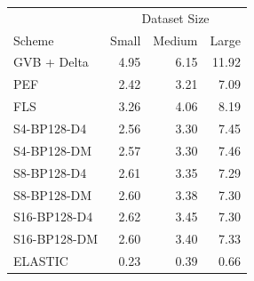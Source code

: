 \begin{tabular}{lrrr}
\toprule
 & \multicolumn{3}{c}{Dataset Size} \\
Scheme & Small & Medium & Large \\
\midrule
GVB + Delta & 4.95 & 6.15 & 11.92 \\
PEF & 2.42 & 3.21 & 7.09 \\
FLS & 3.26 & 4.06 & 8.19 \\
S4-BP128-D4 & 2.56 & 3.30 & 7.45 \\
S4-BP128-DM & 2.57 & 3.30 & 7.46 \\
S8-BP128-D4 & 2.61 & 3.35 & 7.29 \\
S8-BP128-DM & 2.60 & 3.38 & 7.30 \\
S16-BP128-D4 & 2.62 & 3.45 & 7.30 \\
S16-BP128-DM & 2.60 & 3.40 & 7.33 \\
ELASTIC & 0.23 & 0.39 & 0.66 \\
\bottomrule
\end{tabular}
